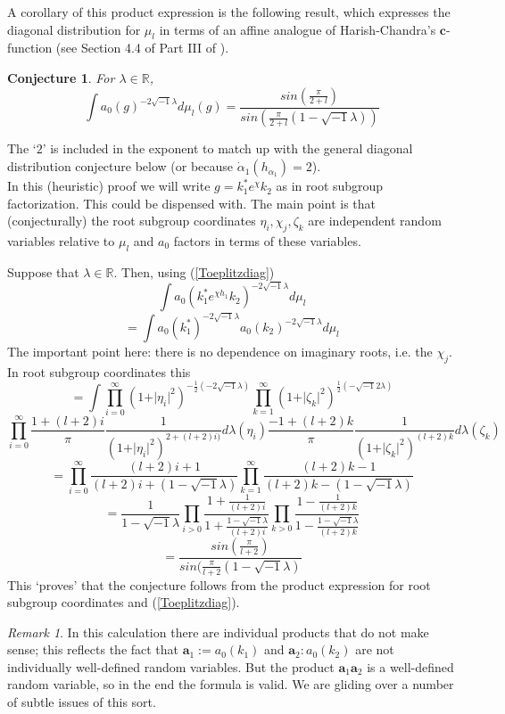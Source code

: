 \documentclass{amsart}
\theoremstyle{conjecture}
\newtheorem{conjecture}{Conjecture}
\theoremstyle{definition}
\theoremstyle{question}
\theoremstyle{questions}
\theoremstyle{remark}
\newtheorem*{remark}{Remark}
\theoremstyle{remarks}
\theoremstyle{example}
\numberwithin{equation}{section}
\begin{document}
A corollary of this product expression is the following result,
which expresses the diagonal distribution for $\mu_l$ in terms of
an affine analogue of Harish-Chandra's $\mathbf c$-function (see
Section 4.4 of Part III of \cite{Pi1}).

\begin{conjecture}\label{HCformula}For $\lambda \in \mathbb R$,
$$\int a_0(g)^{-2\sqrt{-1}\lambda}d\mu_{l}(g)=
\frac {sin(\frac {\pi}{2+l})}{sin(\frac {\pi}{2+l}
(1-\sqrt{-1}\lambda))}$$
\end{conjecture}

The `$2$' is included in the exponent to match up with the general diagonal distribution conjecture below
(or because $\dot {\alpha}_1(h_{\dot{\alpha}_1})=2$).\\

 In this (heuristic) proof we will write
$g=k_1^*e^{\chi}k_2$ as in root subgroup factorization. This could be dispensed with.
The main point is that (conjecturally) the root subgroup coordinates $\eta_i,\chi_j,\zeta_k$
are independent random variables relative to $\mu_l$ and $a_0$ factors in terms of these variables.

Suppose that $\lambda\in \mathbb R$. Then, using (\ref{Toeplitzdiag})
$$\int a_0(k_1^*e^{\chi h_1}k_2)^{-2\sqrt{-1}\lambda}d\mu_l$$
$$=\int a_0(k_1^*)^{-2\sqrt{-1}\lambda}a_0(k_2)^{-2\sqrt{-1}\lambda}d\mu_l$$
The important point here: there is no dependence on imaginary roots, i.e. the $\chi_j$.
In root subgroup coordinates this
$$=\int\prod_{i=0}^{\infty} (1+\vert\eta_i\vert^2)^{-\frac 12(-2\sqrt{-1}\lambda )}\prod_{k=1}^{\infty}
(1+\vert\zeta_k\vert^2)^{\frac 12(-\sqrt{-1}2\lambda )}$$
$$\prod_{i=0}^{\infty}\frac {1+(l+2)i}{\pi}\frac 1{(1+\vert\eta_i\vert^2)^{2+(l+2)i)}}d\lambda
(\eta_i)\frac {-1+(l+2)k}{\pi}\frac{1}{(1+\vert\zeta_k\vert^2)^{(l+2)k}}d\lambda (\zeta_k)$$
$$=\prod_{i=0}^{\infty}\frac {(l+2)i+1}{(l+2)i+(1-\sqrt {-1}\lambda )}\prod_{k=1}^{\infty}\frac {(l+
2)k-1}{(l+2)k-(1-\sqrt {-1}\lambda )}$$
$$=\frac 1{1-\sqrt {-1}\lambda}\prod_{i>0}\frac {1+\frac 1{(l+2)i}}{
1+\frac {1-\sqrt {-1}\lambda}{(l+2)i}}\prod_{k>0}\frac {1-\frac 1{
(l+2)k}}{1-\frac {1-\sqrt {-1}\lambda}{(l+2)k}}$$
$$=\frac {sin(\frac {\pi}{l+2})}{sin(\frac {\pi}{l+2}(1-\sqrt {-1}
\lambda )}$$
This `proves' that the conjecture follows from the product expression for root subgroup coordinates
and (\ref{Toeplitzdiag}).

\begin{remark}\label{aRVremark} In this calculation there are individual products that do not make sense; this reflects the
fact that $\mathbf a_1:=a_0(k_1)$ and $\mathbf a_2:a_0(k_2)$
are not individually well-defined random variables. But the product $\mathbf a_1\mathbf a_2$
is a well-defined random variable, so in the end the formula is valid. We are gliding over a number of subtle issues
of this sort. \end{remark}
\end{document}

